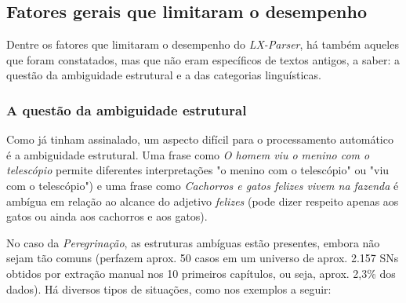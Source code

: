 \documentclass[portuguese]{textolivre}
\begin{document}
\subsection{Fatores gerais que limitaram o desempenho}

Dentre os fatores que limitaram o desempenho do \textit{LX-Parser}, há também aqueles que foram constatados, mas que não eram específicos de textos antigos, a saber: a questão da ambiguidade estrutural e a das categorias linguísticas.

\subsubsection{A questão da ambiguidade estrutural}

Como \textcite{vieira_linguistica_2001} já tinham assinalado, um aspecto difícil para o processamento automático é a ambiguidade estrutural. Uma frase como \textit{O homem viu o menino com o telescópio} permite diferentes interpretações "o menino com o telescópio" ou "viu com o telescópio") e uma frase como \textit{Cachorros e gatos felizes vivem na fazenda} é ambígua em relação ao alcance do adjetivo \textit{felizes} (pode dizer respeito apenas aos gatos ou ainda aos cachorros e aos gatos).

No caso da \textit{Peregrinação}, as estruturas ambíguas estão presentes, embora não sejam tão comuns (perfazem aprox. 50 casos em um universo de aprox. 2.157 SNs obtidos por extração manual nos 10 primeiros capítulos, ou seja, aprox. 2,3\% dos dados). Há diversos tipos de situações, como nos exemplos a seguir:
\end{document}
